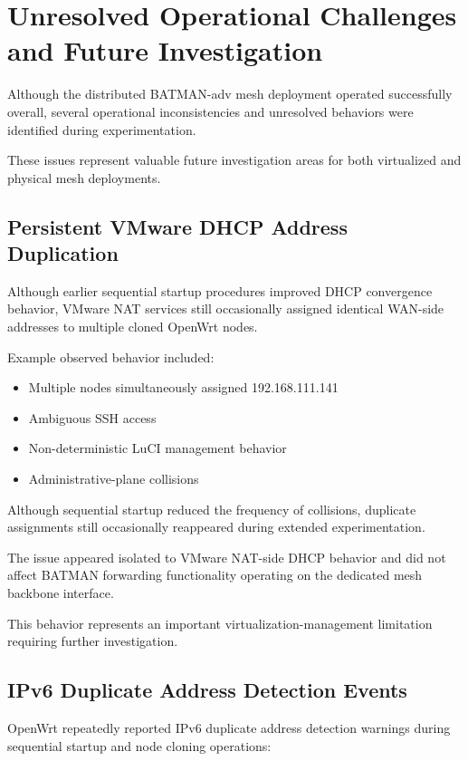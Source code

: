 \documentclass[conference]{IEEEtran}
\begin{document}
\section{Unresolved Operational Challenges and Future Investigation}

Although the distributed BATMAN-adv mesh deployment operated successfully overall, several operational inconsistencies and unresolved behaviors were identified during experimentation.

These issues represent valuable future investigation areas for both virtualized and physical mesh deployments.

\subsection{Persistent VMware DHCP Address Duplication}

Although earlier sequential startup procedures improved DHCP convergence behavior, VMware NAT services still occasionally assigned identical WAN-side addresses to multiple cloned OpenWrt nodes.

Example observed behavior included:

\begin{itemize}
    \item Multiple nodes simultaneously assigned 192.168.111.141
    \item Ambiguous SSH access
    \item Non-deterministic LuCI management behavior
    \item Administrative-plane collisions
\end{itemize}

Although sequential startup reduced the frequency of collisions, duplicate assignments still occasionally reappeared during extended experimentation.

The issue appeared isolated to VMware NAT-side DHCP behavior and did not affect BATMAN forwarding functionality operating on the dedicated mesh backbone interface.

This behavior represents an important virtualization-management limitation requiring further investigation.

\subsection{IPv6 Duplicate Address Detection Events}

OpenWrt repeatedly reported IPv6 duplicate address detection warnings during sequential startup and node cloning operations:
\end{document}
